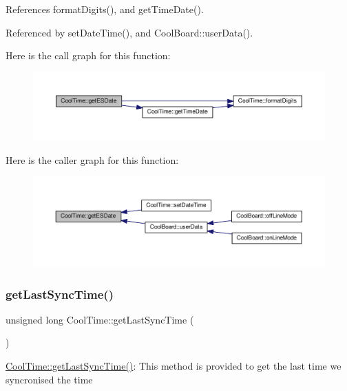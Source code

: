 References format\+Digits(), and get\+Time\+Date().



Referenced by set\+Date\+Time(), and Cool\+Board\+::user\+Data().

Here is the call graph for this function\+:
\nopagebreak
\begin{figure}[H]
\begin{center}
\leavevmode
\includegraphics[width=350pt]{d6/d49/class_cool_time_ac4f32ee513c1328d984306645e8785a4_cgraph}
\end{center}
\end{figure}
Here is the caller graph for this function\+:
\nopagebreak
\begin{figure}[H]
\begin{center}
\leavevmode
\includegraphics[width=350pt]{d6/d49/class_cool_time_ac4f32ee513c1328d984306645e8785a4_icgraph}
\end{center}
\end{figure}
\mbox{\label{class_cool_time_a5d17f707a9d337720493b2bce9d41c21}} 
\subsubsection{\texorpdfstring{get\+Last\+Sync\+Time()}{getLastSyncTime()}}
{\footnotesize\ttfamily unsigned long Cool\+Time\+::get\+Last\+Sync\+Time (\begin{DoxyParamCaption}{ }\end{DoxyParamCaption})}

\hyperlink{class_cool_time_a5d17f707a9d337720493b2bce9d41c21}{Cool\+Time\+::get\+Last\+Sync\+Time()}\+: This method is provided to get the last time we syncronised the time

